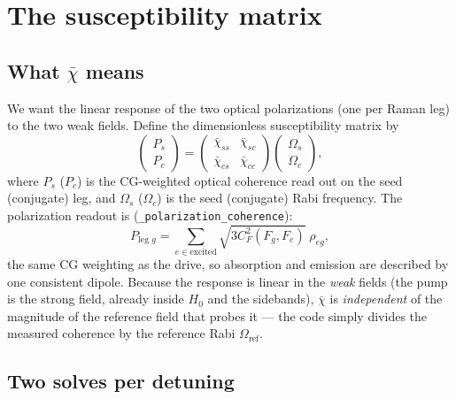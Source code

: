 \documentclass[11pt]{article}
\newcommand{\code}[1]{\texttt{#1}}
\newcommand{\rhobar}{\bar{\chi}}
\begin{document}
\section{The susceptibility matrix}
\label{sec:chi}

\subsection{What \boldmath$\rhobar$ means}

We want the linear response of the two optical polarizations (one per Raman leg)
to the two weak fields. Define the dimensionless susceptibility matrix by
\begin{equation}
\begin{pmatrix}P_s\\[2pt]P_c\end{pmatrix}
=
\begin{pmatrix}\rhobar_{ss}&\rhobar_{sc}\\[2pt]\rhobar_{cs}&\rhobar_{cc}\end{pmatrix}
\begin{pmatrix}\Omega_s\\[2pt]\Omega_c\end{pmatrix},
\label{eq:chimatrix}
\end{equation}
where $P_s$ ($P_c$) is the CG-weighted optical coherence read out on the
seed (conjugate) leg, and $\Omega_s$ ($\Omega_c$) is the seed (conjugate) Rabi
frequency. The polarization readout is (\code{\_polarization\_coherence}):
\begin{equation}
P_{\text{leg }g}=\sum_{e\in\text{excited}}\sqrt{3 C_F^2(F_g,F_e)}\;\rho_{e g},
\label{eq:Pleg}
\end{equation}
the same CG weighting as the drive, so absorption and emission are described by one
consistent dipole. Because the response is linear in the \emph{weak} fields (the
pump is the strong field, already inside $H_0$ and the sidebands), $\rhobar$ is
\emph{independent} of the magnitude of the reference field that probes it --- the
code simply divides the measured coherence by the reference Rabi
$\Omega_{\text{ref}}$.

\subsection{Two solves per detuning}
\end{document}
